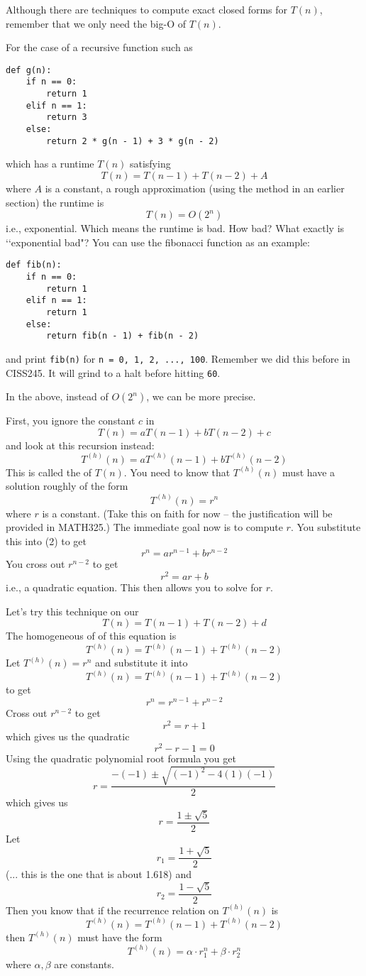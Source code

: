 Although there are techniques to compute exact closed forms for $T(n)$,
remember that we only need the big-O of $T(n)$.

For the case of a recursive function such as 
\begin{Verbatim}[frame=single,fontsize=\footnotesize]
def g(n):
    if n == 0: 
        return 1
    elif n == 1:
        return 3
    else:
        return 2 * g(n - 1) + 3 * g(n - 2)
\end{Verbatim}
which has a runtime $T(n)$ satisfying
\[
T(n) = T(n - 1) + T(n - 2) + A
\]
where $A$ is a constant, a rough approximation (using the method
in an earlier section) the runtime is
\[
T(n) = O(2^n)
\]
i.e., exponential.
Which means the runtime is bad.
How bad? What exactly is \lq\lq exponential bad"?
You can use the fibonacci function as an example:
\begin{Verbatim}[frame=single,fontsize=\footnotesize]
def fib(n):
    if n == 0: 
        return 1
    elif n == 1:
        return 1
    else:
        return fib(n - 1) + fib(n - 2)
\end{Verbatim}
and print \verb!fib(n)! for \verb!n = 0, 1, 2, ..., 100!.
Remember we did this before in CISS245.
It will grind to a halt before hitting \verb!60!.

In the above, instead of $O(2^n)$, we can be more precise.

First, you ignore the constant $c$ in
\[
T(n) = aT(n - 1) + bT(n - 2) + c \tag{1}
\]
and look at this recursion instead:
\[
T^{(h)}(n) = aT^{(h)}(n - 1) + bT^{(h)}(n - 2) \tag{2}
\]
This is called the  of $T(n)$.
You need to know that $T^{(h)}(n)$ must have a solution
roughly of the form
\[
T^{(h)}(n) = r^n
\]
where $r$ is a constant.
(Take this on faith for now -- the justification will be
provided in MATH325.)
The immediate goal now is to compute $r$.
You substitute this into (2) to get
\[
r^n = ar^{n-1} + br^{n-2}
\]
You cross out $r^{n - 2}$ to get
\[
r^2 = ar + b
\]
i.e., a quadratic equation.
This then allows you to solve for $r$.

Let's try this technique on our
\[
T(n) = T(n - 1) + T(n - 2) + d
\]
The homogeneous of of this equation is
\[
T^{(h)}(n) = T^{(h)}(n - 1) + T^{(h)}(n - 2)
\]
Let $T^{(h)}(n) = r^n$ and substitute it into
\[
T^{(h)}(n) = T^{(h)}(n - 1) + T^{(h)}(n - 2)
\]
to get
\[
r^n = r^{n - 1} + r^{n - 2}
\]
Cross out $r^{n - 2}$ to get
\[
r^2 = r + 1
\]
which gives us the quadratic
\[
r^2 - r - 1 = 0
\]
Using the quadratic polynomial root formula you get
\[
r = \frac{-(-1) \pm \sqrt{(-1)^2 - 4(1)(-1)} }{2}
\]
which gives us
\[
r = \frac{1 \pm \sqrt{5}}{2}
\]
Let 
\[
r_1 = \frac{1 + \sqrt{5} }{2} 
\]
(... this is the one that is about 1.618)
and 
\[
r_2 = \frac{1 - \sqrt{5} }{2}
\]
Then you know that if the recurrence relation on $T^{(h)}(n)$ is
\[
T^{(h)}(n) = T^{(h)}(n - 1) + T^{(h)}(n - 2)
\]
then $T^{(h)}(n)$ must have the form
\[
T^{(h)}(n) = \alpha \cdot r_1^n + \beta \cdot r_2^n
\]
where $\alpha, \beta$ are constants.

